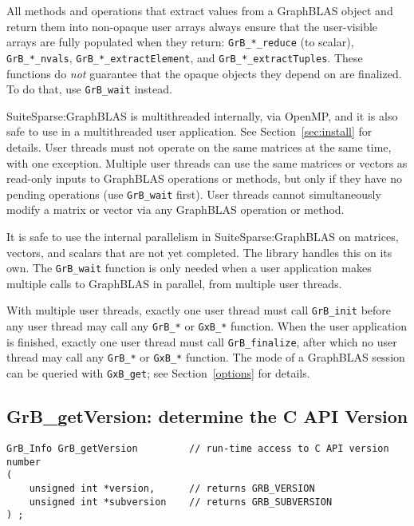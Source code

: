\documentclass[12pt]{article}
\begin{document}
All methods and operations that extract values from a GraphBLAS object and
return them into non-opaque user arrays always ensure that the user-visible
arrays are fully populated when they return: \verb'GrB_*_reduce' (to scalar),
\verb'GrB_*_nvals', \verb'GrB_*_extractElement', and
\verb'GrB_*_extractTuples'.  These functions do {\em not} guarantee that the
opaque objects they depend on are finalized.  To do that, use
\verb'GrB_wait' instead.

SuiteSparse:GraphBLAS is multithreaded internally, via OpenMP, and it is also
safe to use in a multithreaded user application.  See Section~\ref{sec:install}
for details.
User threads must not operate on the same matrices at the same time, with one
exception.  Multiple user threads can use the same matrices or vectors as
read-only inputs to GraphBLAS operations or methods, but only if they have no
pending operations (use \verb'GrB_wait'
first).  User threads cannot simultaneously modify a matrix or vector via any
GraphBLAS operation or method.

It is safe to use the internal parallelism in SuiteSparse:GraphBLAS on
matrices, vectors, and scalars that are not yet completed.  The library
handles this on its own.  The \verb'GrB_wait' function is only
needed when a user application makes multiple calls to GraphBLAS in parallel,
from multiple user threads.

With multiple user threads, exactly one user thread must call \verb'GrB_init'
before any user thread may call any \verb'GrB_*' or \verb'GxB_*' function.
When the user application is finished, exactly one user thread must call
\verb'GrB_finalize', after which no user thread may call any \verb'GrB_*' or
\verb'GxB_*' function.
The mode of a GraphBLAS session can be queried with \verb'GxB_get';
see Section~\ref{options} for details.

\subsection{{\sf GrB\_getVersion:} determine the C API Version} %
\label{getVersion}

\begin{mdframed}[userdefinedwidth=6in]
{\footnotesize
\begin{verbatim}
GrB_Info GrB_getVersion         // run-time access to C API version number
(
    unsigned int *version,      // returns GRB_VERSION
    unsigned int *subversion    // returns GRB_SUBVERSION
) ;
\end{verbatim}
}\end{mdframed}
\end{document}
